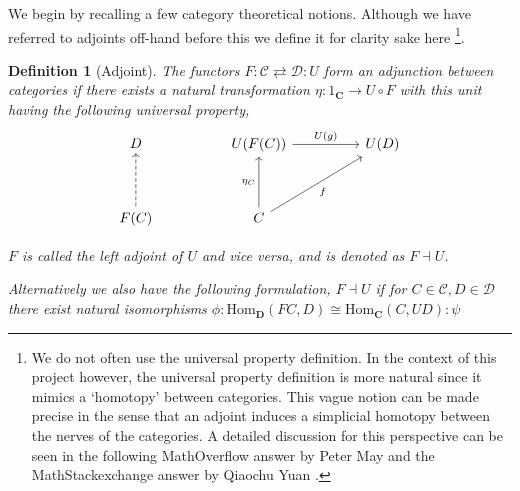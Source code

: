 \documentclass[12pt]{report}
\numberwithin{equation}{section}
\newtheorem{definition}[dummy]{Definition}
\begin{document}
	We begin by recalling a few category theoretical notions. Although we have referred to adjoints off-hand before this we define it for clarity sake here \footnote{We do not often use the universal property definition. In the context of this project however, the universal property definition is more natural since it mimics a `homotopy' between categories. This vague notion can be made precise in the sense that an adjoint induces a simplicial homotopy between the nerves of the categories. A detailed discussion for this perspective can be seen in the following MathOverflow answer by Peter May \cite{74446} and the MathStackexchange answer by Qiaochu Yuan \cite{370719}.}. 
	
	\begin{definition}[Adjoint]
		The functors $F: \mathcal{C} \rightleftarrows \mathcal{D}: U$ form an adjunction between categories if there exists a natural transformation $\eta: 1_\mathbf{C} \to U \circ F$ with this unit having the following universal property,
		\[\begin{tikzcd}
			D && {U(F(C))} && {U(D)} \\
			\\
			{F(C)} && C
			\arrow["f"', from=3-3, to=1-5]
			\arrow["{\eta_C}", from=3-3, to=1-3]
			\arrow["{U(g)}", from=1-3, to=1-5]
			\arrow[dashed, from=3-1, to=1-1]
		\end{tikzcd}\]
		
		$F$ is called the left adjoint of $U$ and vice versa, and is denoted as $F \dashv U$.
		
		Alternatively we also have the following formulation, $F \dashv U$ if for $C\in \mathcal{C}, D \in \mathcal{D}$ there exist natural isomorphisms $\phi: \textrm{Hom}_\mathbf{D}(FC, D) \cong \textrm{Hom}_\mathbf{C}(C, UD):\psi$
	\end{definition}
	
\end{document}
